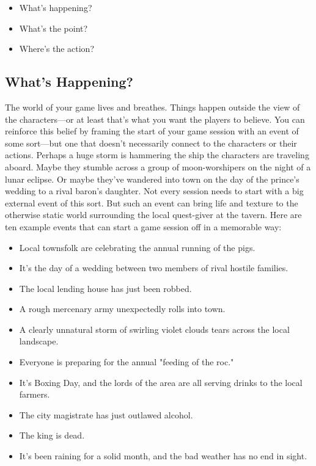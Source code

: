 \documentclass[10pt,a4paper,twoside,bg=print,twocolumn,openany,nodeprecatedcode]{dndbook}
\begin{document}
\begin{itemize}
\item What's happening?
\item What's the point?
\item Where's the action?
\end{itemize}

\subsection{What's Happening?}
The world of your game lives and breathes. Things happen outside the view of the characters—or at least that's what you want the players to believe. You can reinforce this belief by framing the start of your game session with an event of some sort—but one that doesn't necessarily connect to the characters or their actions. Perhaps a huge storm is hammering the ship the characters are traveling aboard. Maybe they stumble across a group of moon-worshipers on the night of a lunar eclipse. Or maybe they've wandered into town on the day of the prince's wedding to a rival baron's daughter.
Not every session needs to start with a big external event of this sort. But such an event can bring life and texture to the otherwise static world surrounding the local quest-giver at the tavern.
Here are ten example events that can start a game session off in a memorable way:

\begin{itemize}
\item Local townsfolk are celebrating the annual running of the pigs.
\item It's the day of a wedding between two members of rival hostile families.
\item The local lending house has just been robbed.
\item A rough mercenary army unexpectedly rolls into town.
\item A clearly unnatural storm of swirling violet clouds tears across the local landscape.
\item Everyone is preparing for the annual "feeding of the roc."
\item It's Boxing Day, and the lords of the area are all serving drinks to the local farmers.
\item The city magistrate has just outlawed alcohol.
\item The king is dead.
\item It's been raining for a solid month, and the bad weather has no end in sight.
\end{itemize}
\end{document}
